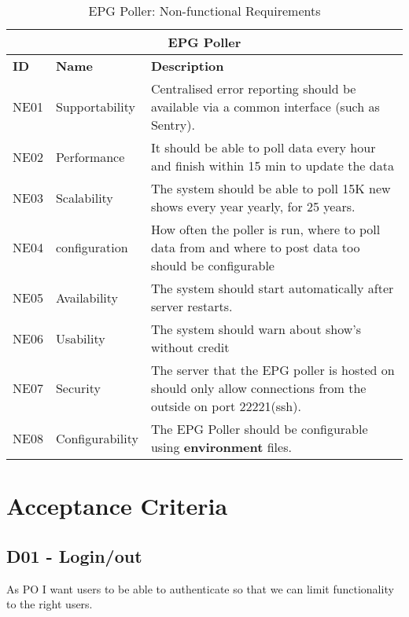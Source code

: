 \documentclass[a4paper,12pt]{article}
\begin{document}
\begin{table}
    \begin{tabular}{|p{1cm}|p{3.5cm}|p{11cm}|} 
        \hline
        \multicolumn{3}{|c|}{\textbf{EPG Poller}} \\
        \hline
        \textbf{ID} & \textbf{Name} & \textbf{Description} \\
        \hline
        NE01 & Supportability &  Centralised error reporting should be available via a common interface (such as Sentry).\\
        \hline
        NE02 & Performance &  It should be able to poll data every hour and finish within 15 min to update the data \\
        \hline
        NE03 & Scalability &  The system should be able to poll 15K new shows every year yearly, for 25 years. \\
        \hline
        NE04 & configuration & How often the poller is run, where to poll data from and where to post data too should be configurable \\
        \hline
        NE05 & Availability &  The system should start automatically after server restarts. \\
        \hline
        NE06 & Usability & The system should warn about show's without credit \\
        \hline
        NE07 & Security & The server that the EPG poller is hosted on should only allow connections from the outside on port 22221(ssh). \\
        \hline
        NE08 & Configurability & The EPG Poller should be configurable using \textbf{environment} files. \\
        \hline
    \end{tabular}
    \caption{EPG Poller: Non-functional Requirements}
    \label{tab:epg_poller_nfunreq}
\end{table}

\newpage
\section{Acceptance Criteria}
\subsection{D01 - Login/out}
As PO I want users to be able to authenticate so that we can limit functionality to the right users.
\end{document}
